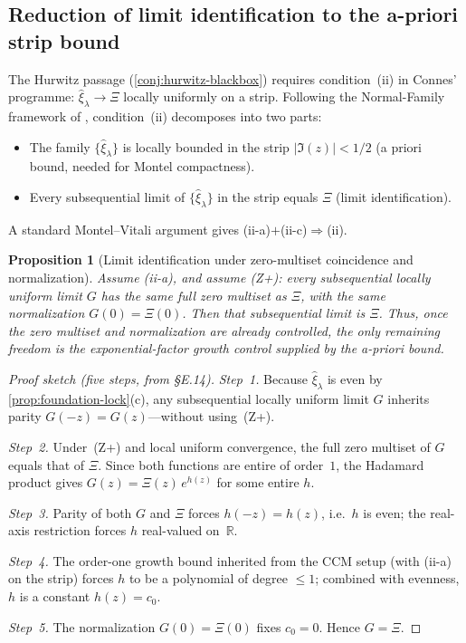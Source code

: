 \documentclass[12pt,a4paper]{article}
\newtheorem{proposition}[theorem]{Proposition}
\theoremstyle{definition}
\theoremstyle{remark}
\begin{document}
\subsection{Reduction of limit identification to the a-priori strip bound}
\label{subsec:iic-to-iia}

The Hurwitz passage (\cref{conj:hurwitz-blackbox}) requires condition~(ii)
in Connes' programme: $\hat{\xi}_\lambda \to \Xi$ locally uniformly on a
strip.  Following the Normal-Family framework of \cite{Geiger2026evendom},
condition~(ii) decomposes into two parts:
\begin{itemize}
  \item[(ii-a)] The family $\{\hat{\xi}_\lambda\}$ is locally bounded
    in the strip $|\Im(z)| < 1/2$ (a priori bound, needed for Montel
    compactness).
  \item[(ii-c)] Every subsequential limit of $\{\hat{\xi}_\lambda\}$ in
    the strip equals $\Xi$ (limit identification).
\end{itemize}
A standard Montel--Vitali argument gives (ii-a)$+$(ii-c)$\Rightarrow$(ii).

\begin{proposition}[Limit identification under zero-multiset coincidence and normalization]
\label{prop:iic-absorbed}
Assume (ii-a), and assume \textup{(Z+)}: every subsequential locally
uniform limit $G$ has the same full zero multiset as $\Xi$,
with the same normalization $G(0)=\Xi(0)$.  Then that subsequential
limit is $\Xi$.  Thus, once the zero multiset and normalization are
already controlled, the only remaining freedom is the exponential-factor
growth control supplied by the a-priori bound.
\end{proposition}

\begin{proof}[Proof sketch (five steps, from \cite{Geiger2026evendom} §E.14)]
\emph{Step~1.}  Because $\hat{\xi}_\lambda$ is even by
\cref{prop:foundation-lock}(c), any subsequential locally uniform limit
$G$ inherits parity $G(-z)=G(z)$---without using~(Z+).

\emph{Step~2.}  Under~(Z+) and local uniform convergence, the full zero
multiset of $G$ equals that of $\Xi$.  Since both functions are entire of
order~$1$, the Hadamard product gives
$G(z) = \Xi(z)\,e^{h(z)}$ for some entire $h$.

\emph{Step~3.}  Parity of both $G$ and $\Xi$ forces $h(-z)=h(z)$, i.e.\
$h$ is even; the real-axis restriction forces $h$ real-valued on~$\mathbb{R}$.

\emph{Step~4.}  The order-one growth bound inherited from the CCM setup
(with (ii-a) on the strip) forces $h$ to be a polynomial of degree
$\le 1$; combined with evenness, $h$ is a constant $h(z) = c_0$.

\emph{Step~5.}  The normalization $G(0)=\Xi(0)$ fixes $c_0 = 0$.
Hence $G = \Xi$.
\end{proof}
\end{document}
